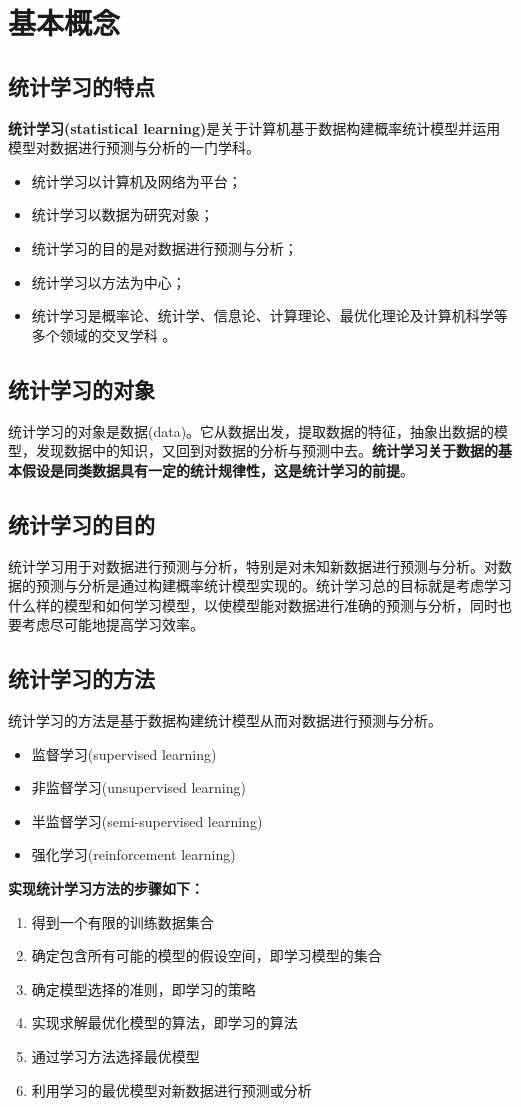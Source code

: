 \section{基本概念}

\subsection*{统计学习的特点}
\textbf{统计学习(statistical learning)}是关于计算机基于数据构建概率统计模型并运用模型对数据进行预测与分析的一门学科。
\begin{itemize}
	\item 统计学习以计算机及网络为平台；
	\item 统计学习以数据为研究对象；
	\item 统计学习的目的是对数据进行预测与分析；
	\item 统计学习以方法为中心；
	\item 统计学习是概率论、统计学、信息论、计算理论、最优化理论及计算机科学等多个领域的交叉学科 。
\end{itemize}

\subsection*{统计学习的对象}
统计学习的对象是数据(data)。它从数据出发，提取数据的特征，抽象出数据的模型，发现数据中的知识，又回到对数据的分析与预测中去。\textbf{统计学习关于数据的基本假设是同类数据具有一定的统计规律性，这是统计学习的前提}。
\subsection*{统计学习的目的}
统计学习用于对数据进行预测与分析，特别是对未知新数据进行预测与分析。对数据的预测与分析是通过构建概率统计模型实现的。统计学习总的目标就是考虑学习什么样的模型和如何学习模型，以使模型能对数据进行准确的预测与分析，同时也要考虑尽可能地提高学习效率。
\subsection*{统计学习的方法}
统计学习的方法是基于数据构建统计模型从而对数据进行预测与分析。
\begin{itemize}
	\item 监督学习(supervised learning)
	\item 非监督学习(unsupervised learning)
	\item 半监督学习(semi-supervised learning)
	\item 强化学习(reinforcement learning)
\end{itemize}
\textbf{实现统计学习方法的步骤如下：}
\begin{enumerate}[(1)]
	\item 得到一个有限的训练数据集合
	\item 确定包含所有可能的模型的假设空间，即学习模型的集合
	\item 确定模型选择的准则，即学习的策略
	\item 实现求解最优化模型的算法，即学习的算法 
	\item 通过学习方法选择最优模型
	\item 利用学习的最优模型对新数据进行预测或分析
\end{enumerate}

